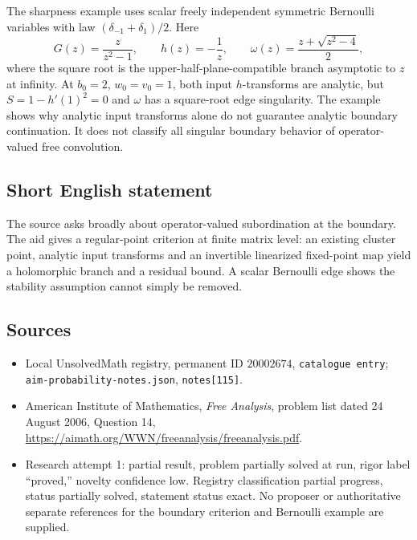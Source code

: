 \documentclass[11pt]{article}
\begin{document}
The sharpness example uses scalar freely independent symmetric Bernoulli variables with law $(\delta_{-1}+\delta_1)/2$. Here
\[
G(z)=\frac{z}{z^2-1},\qquad h(z)=-\frac1z,\qquad
\omega(z)=\frac{z+\sqrt{z^2-4}}2,
\]
where the square root is the upper-half-plane-compatible branch asymptotic to $z$ at infinity. At $b_0=2$, $w_0=v_0=1$, both input $h$-transforms are analytic, but $S=1-h'(1)^2=0$ and $\omega$ has a square-root edge singularity. The example shows why analytic input transforms alone do not guarantee analytic boundary continuation. It does not classify all singular boundary behavior of operator-valued free convolution.
\subsection{Short English statement}
The source asks broadly about operator-valued subordination at the boundary. The aid gives a regular-point criterion at finite matrix level: an existing cluster point, analytic input transforms and an invertible linearized fixed-point map yield a holomorphic branch and a residual bound. A scalar Bernoulli edge shows the stability assumption cannot simply be removed.
\subsection{Sources}
\begin{itemize}
\item Local UnsolvedMath registry, permanent ID $20002674$, \texttt{catalogue entry}; \texttt{aim-probability-notes.json}, \texttt{notes[115]}.
\item American Institute of Mathematics, \emph{Free Analysis}, problem list dated 24 August 2006, Question 14, \url{https://aimath.org/WWN/freeanalysis/freeanalysis.pdf}.
\item Research attempt 1: partial result, problem partially solved at run, rigor label ``proved,'' novelty confidence low. Registry classification partial progress, status partially solved, statement status exact. No proposer or authoritative separate references for the boundary criterion and Bernoulli example are supplied.
\end{itemize}
\end{document}
